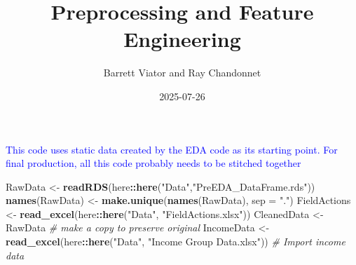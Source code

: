 \documentclass[
]{article}
\title{Preprocessing and Feature Engineering}
\author{Barrett Viator and Ray Chandonnet}
\date{2025-07-26}
\newenvironment{Shaded}{\begin{snugshade}}{\end{snugshade}}
\newcommand{\AttributeTok}[1]{\textcolor[rgb]{0.13,0.29,0.53}{#1}}
\newcommand{\CommentTok}[1]{\textcolor[rgb]{0.56,0.35,0.01}{\textit{#1}}}
\newcommand{\FunctionTok}[1]{\textcolor[rgb]{0.13,0.29,0.53}{\textbf{#1}}}
\newcommand{\NormalTok}[1]{#1}
\newcommand{\OtherTok}[1]{\textcolor[rgb]{0.56,0.35,0.01}{#1}}
\newcommand{\SpecialCharTok}[1]{\textcolor[rgb]{0.81,0.36,0.00}{\textbf{#1}}}
\newcommand{\StringTok}[1]{\textcolor[rgb]{0.31,0.60,0.02}{#1}}
\begin{document}
\maketitle

\textcolor{blue}{This code uses static data created by the EDA code as its starting point. For final production, all this code probably needs to be stitched together}

\begin{Shaded}
\begin{Highlighting}[]
\NormalTok{RawData }\OtherTok{\textless{}{-}} \FunctionTok{readRDS}\NormalTok{(here}\SpecialCharTok{::}\FunctionTok{here}\NormalTok{(}\StringTok{"Data"}\NormalTok{,}\StringTok{"PreEDA\_DataFrame.rds"}\NormalTok{))}
\FunctionTok{names}\NormalTok{(RawData) }\OtherTok{\textless{}{-}} \FunctionTok{make.unique}\NormalTok{(}\FunctionTok{names}\NormalTok{(RawData), }\AttributeTok{sep =} \StringTok{"."}\NormalTok{)}
\NormalTok{FieldActions }\OtherTok{\textless{}{-}} \FunctionTok{read\_excel}\NormalTok{(here}\SpecialCharTok{::}\FunctionTok{here}\NormalTok{(}\StringTok{"Data"}\NormalTok{, }\StringTok{"FieldActions.xlsx"}\NormalTok{))}
\NormalTok{CleanedData }\OtherTok{\textless{}{-}}\NormalTok{ RawData }\CommentTok{\# make a copy to preserve original}
\NormalTok{IncomeData }\OtherTok{\textless{}{-}} \FunctionTok{read\_excel}\NormalTok{(here}\SpecialCharTok{::}\FunctionTok{here}\NormalTok{(}\StringTok{"Data"}\NormalTok{, }\StringTok{"Income Group Data.xlsx"}\NormalTok{)) }\CommentTok{\# Import income data}
\end{Highlighting}
\end{Shaded}
\end{document}
